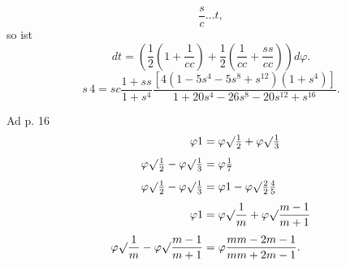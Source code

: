 \[\frac sc\ldots t,\]
\noindent so ist
\[dt=\left(\frac12\left(1+\frac1{cc}\right)+\frac12\left(\frac1{cc}+\frac{ss}{cc}\right)\right)d\varphi.\]
\[s\,4=sc\frac{1+ss}{1+s^4}\frac{[4(1-5s^4-5s^8+s^{12})(1+s^4)]}{1+20s^4-26s^8-20s^{12}+s^{16}}.\]
\ClosingRule
{}
\noindent{\small S. 24]}
\par\noindent\hspace*{\parindent}Ad p. 16
\[\begin{aligned}
\varphi1&=\varphi\surd\tfrac12+\varphi\surd\tfrac13\\[4pt]
\varphi\surd\tfrac12-\varphi\surd\tfrac13&=\varphi\tfrac17\\[4pt]
\varphi\surd\tfrac12-\varphi\surd\tfrac13&=\varphi1-\varphi\surd\tfrac22\tfrac45\\[4pt]
\varphi1&=\varphi\surd\frac1m+\varphi\surd\frac{m-1}{m+1}\\[4pt]
\varphi\surd\frac1m-\varphi\surd\frac{m-1}{m+1}&=\varphi\frac{mm-2m-1}{mm+2m-1}.
\end{aligned}\]
\ClosingRule
\clearpage
\endgroup
